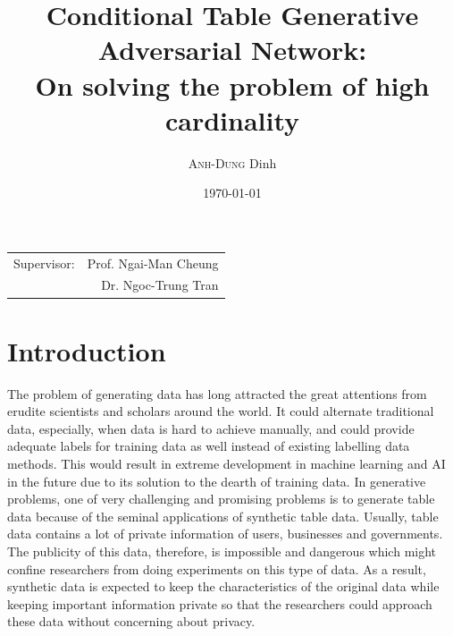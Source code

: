 \documentclass{article}
\title{Conditional Table Generative Adversarial Network:\\ On solving the problem of high cardinality} %
\author{\textsc{Anh-Dung} Dinh} %
\date{\today} %
\begin{document}
\maketitle %
\begin{center}
\begin{tabular}{l r}
Supervisor: & Prof. Ngai-Man Cheung \\%
& Dr. Ngoc-Trung Tran
\end{tabular}
\end{center}

\tableofcontents

\section{Introduction}

The problem of generating data has long attracted the great attentions from erudite scientists and scholars around the world. It could alternate traditional data, especially, when data is hard to achieve manually, and could provide adequate labels for training data as well instead of existing labelling data methods. This would result in extreme development in machine learning and \ac{AI} in the future due to its solution to the dearth of training data. In generative problems, one of very challenging and promising problems is to generate table data because of the seminal applications of synthetic table data. Usually, table data contains a lot of private information of users, businesses and governments. The publicity of this data, therefore, is impossible and dangerous which might confine researchers from doing experiments on this type of data. As a result, synthetic data is expected to keep the characteristics of the original data while keeping important information private so that the researchers could approach these data without concerning about privacy. 
\end{document}

